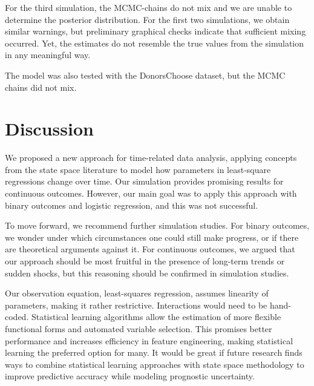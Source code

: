 \documentclass{article}
\begin{document}
For the third simulation, the MCMC-chains do not mix and we are unable to determine the posterior distribution. For the first two simulations, we obtain similar warnings, but preliminary graphical checks indicate that sufficient mixing occurred. Yet, the estimates do not resemble the true values from the simulation in any meaningful way.

The model was also tested with the DonorsChoose dataset, but the MCMC chains did not mix.

\section{Discussion}\label{sec:discussion}

We proposed a new approach for time-related data analysis, applying concepts from the state space literature to model how parameters in least-square regressions change over time. Our simulation provides promising results for continuous outcomes. However, our main goal was to apply this approach with binary outcomes and logistic regression, and this was not successful.

To move forward, we recommend further simulation studies. For binary outcomes, we wonder under which circumstances one could still make progress, or if there are theoretical arguments against it. For continuous outcomes, we argued that our approach should be most fruitful in the presence of long-term trends or sudden shocks, but this reasoning should be confirmed in simulation studies.

Our observation equation, least-squares regression, assumes linearity of parameters, making it rather restrictive. Interactions would need to be hand-coded. Statistical learning algorithms allow the estimation of more flexible functional forms and automated variable selection. This promises better performance and increases efficiency in feature engineering, making statistical learning the preferred option for many. It would be great if future research finds ways to combine statistical learning approaches with state space methodology to improve predictive accuracy while modeling prognostic uncertainty.






\end{document}

